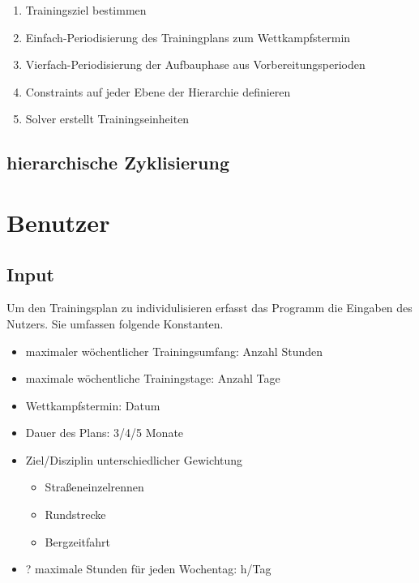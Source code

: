     \begin{enumerate}
        \item Trainingsziel bestimmen
        \item Einfach-Periodisierung des Trainingplans zum Wettkampfstermin
        \item Vierfach-Periodisierung der Aufbauphase aus Vorbereitungsperioden
        \item Constraints auf jeder Ebene der Hierarchie definieren 
        \item Solver erstellt Trainingseinheiten
    \end{enumerate}
    \subsection{hierarchische Zyklisierung}



\section{Benutzer}
\subsection{Input}
Um den Trainingsplan zu individulisieren erfasst das Programm die Eingaben des Nutzers. Sie umfassen folgende Konstanten.
\begin{itemize}
    \item maximaler wöchentlicher Trainingsumfang: Anzahl Stunden
    \item maximale wöchentliche Trainingstage: Anzahl Tage
    \item Wettkampfstermin: Datum
    \item Dauer des Plans: 3/4/5 Monate
    \item Ziel/Disziplin \cite[S.11]{Radsporttraining} unterschiedlicher Gewichtung\cite[S.14]{Radsporttraining}
    \begin{itemize}
        \item Straßeneinzelrennen
        \item Rundstrecke
        \item Bergzeitfahrt
    \end{itemize}
    \item ? maximale Stunden für jeden Wochentag: h/Tag
\end{itemize}

